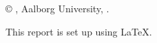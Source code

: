 \hypersetup{pageanchor=false} %
\thispagestyle{empty}
{\small
\strut\vfill
\noindent \copyright{} \groupname{} , Aalborg University, \MakeLowercase{\projectperiod{}}.\par
\vspace{0.3cm}
This report is set up using \LaTeX.


}
\clearpage
\hypersetup{pageanchor=true} %